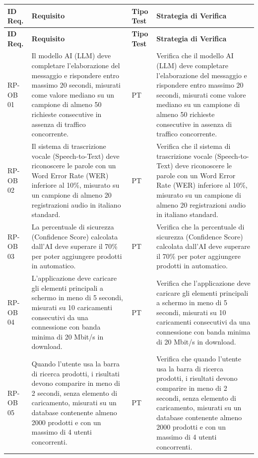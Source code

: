 \documentclass[a4paper,11pt,oneside]{scrartcl}
\begin{document}
\begin{longtable}{|p{1.5cm}|p{5.5cm}|p{1.8cm}|p{5cm}|}
\hline
\textbf{ID Req.} & \textbf{Requisito} & \textbf{Tipo Test} & \textbf{Strategia di Verifica} \\
\hline
\endfirsthead
\hline
\textbf{ID Req.} & \textbf{Requisito} & \textbf{Tipo Test} & \textbf{Strategia di Verifica} \\
\hline
\endhead

RP-OB 01 & Il modello AI (LLM) deve completare l'elaborazione del messaggio e rispondere entro massimo 20 secondi, misurati come valore mediano su un campione di almeno 50 richieste consecutive in assenza di traffico concorrente. & PT & Verifica che il modello AI (LLM) deve completare l'elaborazione del messaggio e rispondere entro massimo 20 secondi, misurati come valore mediano su un campione di almeno 50 richieste consecutive in assenza di traffico concorrente. \\ \hline
RP-OB 02 & Il sistema di trascrizione vocale (Speech-to-Text) deve riconoscere le parole con un Word Error Rate (WER) inferiore al 10\%, misurato su un campione di almeno 20 registrazioni audio in italiano standard. & PT & Verifica che il sistema di trascrizione vocale (Speech-to-Text) deve riconoscere le parole con un Word Error Rate (WER) inferiore al 10\%, misurato su un campione di almeno 20 registrazioni audio in italiano standard. \\ \hline
RP-OB 03 & La percentuale di sicurezza (Confidence Score) calcolata dall'AI deve superare il 70\% per poter aggiungere prodotti in automatico. & PT & Verifica che la percentuale di sicurezza (Confidence Score) calcolata dall'AI deve superare il 70\% per poter aggiungere prodotti in automatico. \\ \hline
RP-OB 04 & L'applicazione deve caricare gli elementi principali a schermo in meno di 5 secondi, misurati su 10 caricamenti consecutivi da una connessione con banda minima di 20 Mbit/s in download. & PT & Verifica che l'applicazione deve caricare gli elementi principali a schermo in meno di 5 secondi, misurati su 10 caricamenti consecutivi da una connessione con banda minima di 20 Mbit/s in download. \\ \hline
RP-OB 05 & Quando l'utente usa la barra di ricerca prodotti, i risultati devono comparire in meno di 2 secondi, senza elemento di caricamento, misurati su un database contenente almeno 2000 prodotti e con un massimo di 4 utenti concorrenti. & PT & Verifica che quando l'utente usa la barra di ricerca prodotti, i risultati devono comparire in meno di 2 secondi, senza elemento di caricamento, misurati su un database contenente almeno 2000 prodotti e con un massimo di 4 utenti concorrenti. \\ \hline

\end{longtable}
\end{document}

